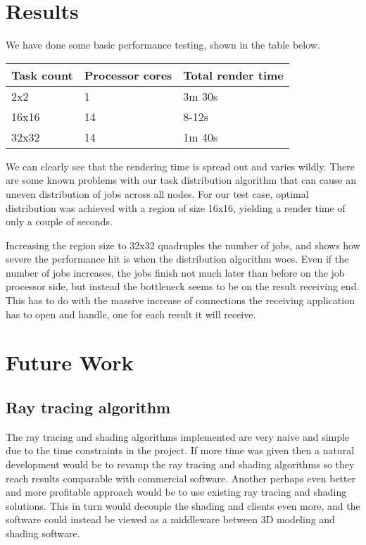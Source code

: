 \chapter{Results}
We have done some basic performance testing, shown in the table below.

\begin{center}
    \begin{tabular}{ | l | l | l |} \hline
    Task count & Processor cores & Total render time \\ \hline
    2x2 & 1 & 3m 30s \\ \hline
    16x16 & 14 & 8-12s \\ \hline
    32x32 & 14 & 1m 40s \\ \hline
    \end{tabular}
\end{center}

We can clearly see that the rendering time is spread out and varies wildly. There are
some known problems with our task distribution algorithm that can cause an uneven distribution
of jobs across all nodes. For our test case, optimal distribution was achieved with a region of size 16x16, yielding a render time of only a couple of seconds.

Increasing the region size to 32x32 quadruples the number of jobs, and shows how severe the performance hit is
when the distribution algorithm woes. Even if the number of jobs increases, the jobs finish not much later than before on the job processor side, but instead the bottleneck seems to be on the result receiving end. This has to do with the massive increase of connections the receiving application has to open and handle, one for each result it will receive.

% 

\chapter{Future Work}
\section{Ray tracing algorithm}
The ray tracing and shading algorithms implemented are very naive and simple due to the time constraints in the project. If more time was given then a natural development would be to revamp the ray tracing and shading algorithms so they reach results comparable with commercial software. Another perhaps even better and more profitable approach would be to use existing ray tracing and shading solutions. This in turn would decouple the shading and clients even more, and the software could instead be viewed as a middleware between 3D modeling and shading software.

